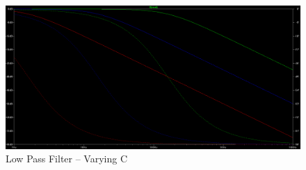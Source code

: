\begin{figure}
\includegraphics[keepaspectratio=true,width=6in]{./figures/parameters/lpFiltVarC.png}
\centering
\caption{Low Pass Filter -- Varying C}
\label{lpFiltVarC}
\end{figure}
